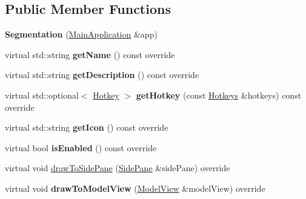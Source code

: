 \subsection*{Public Member Functions}
\begin{DoxyCompactItemize}
\item 
\mbox{\label{classpepr3d_1_1_segmentation_a5717e5e9983faa1e33b9008a97aae787}} 
{\bfseries Segmentation} (\mbox{\hyperlink{classpepr3d_1_1_main_application}{Main\+Application}} \&app)
\item 
\mbox{\label{classpepr3d_1_1_segmentation_a992852fd1abddc360051ec6af862c75f}} 
virtual std\+::string {\bfseries get\+Name} () const override
\item 
\mbox{\label{classpepr3d_1_1_segmentation_af2c28c0bff05165c8283e3727e09f726}} 
virtual std\+::string {\bfseries get\+Description} () const override
\item 
\mbox{\label{classpepr3d_1_1_segmentation_a6e48ed1de1808a831027cea1bb3c4332}} 
virtual std\+::optional$<$ \mbox{\hyperlink{structpepr3d_1_1_hotkey}{Hotkey}} $>$ {\bfseries get\+Hotkey} (const \mbox{\hyperlink{classpepr3d_1_1_hotkeys}{Hotkeys}} \&hotkeys) const override
\item 
\mbox{\label{classpepr3d_1_1_segmentation_af67898a59f818d71a97069b2fe62bd25}} 
virtual std\+::string {\bfseries get\+Icon} () const override
\item 
\mbox{\label{classpepr3d_1_1_segmentation_acd5aff018741e43604441d50701492fa}} 
virtual bool {\bfseries is\+Enabled} () const override
\item 
virtual void \mbox{\hyperlink{classpepr3d_1_1_segmentation_ac823ffa67827629012a45f3ac9a22c72}{draw\+To\+Side\+Pane}} (\mbox{\hyperlink{classpepr3d_1_1_side_pane}{Side\+Pane}} \&side\+Pane) override
\item 
\mbox{\label{classpepr3d_1_1_segmentation_aba217ddc3fefb9f9a253bcaee39df3b2}} 
virtual void {\bfseries draw\+To\+Model\+View} (\mbox{\hyperlink{classpepr3d_1_1_model_view}{Model\+View}} \&model\+View) override
\item 

\end{DoxyCompactItemize}
